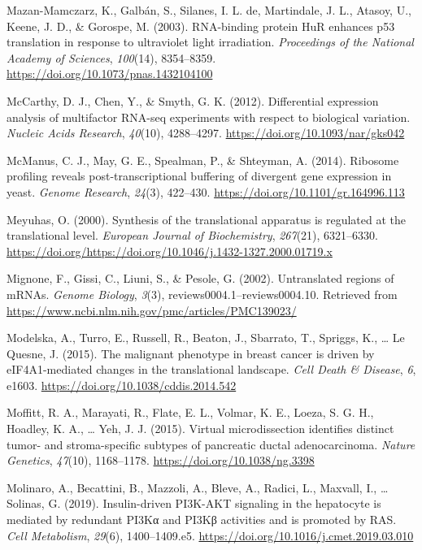 \documentclass[12pt,openany]{book}
\begin{document}
\hypertarget{ref-Mazan-Mamczarz2003}{}
Mazan-Mamczarz, K., Galbán, S., Silanes, I. L. de, Martindale, J. L.,
Atasoy, U., Keene, J. D., \& Gorospe, M. (2003). RNA-binding protein HuR
enhances p53 translation in response to ultraviolet light irradiation.
\emph{Proceedings of the National Academy of Sciences}, \emph{100}(14),
8354--8359. \url{https://doi.org/10.1073/pnas.1432104100}

\hypertarget{ref-McCarthy2012}{}
McCarthy, D. J., Chen, Y., \& Smyth, G. K. (2012). Differential
expression analysis of multifactor RNA-seq experiments with respect to
biological variation. \emph{Nucleic Acids Research}, \emph{40}(10),
4288--4297. \url{https://doi.org/10.1093/nar/gks042}

\hypertarget{ref-McManus2014}{}
McManus, C. J., May, G. E., Spealman, P., \& Shteyman, A. (2014).
Ribosome profiling reveals post-transcriptional buffering of divergent
gene expression in yeast. \emph{Genome Research}, \emph{24}(3),
422--430. \url{https://doi.org/10.1101/gr.164996.113}

\hypertarget{ref-Meyuhas2000}{}
Meyuhas, O. (2000). Synthesis of the translational apparatus is
regulated at the translational level. \emph{European Journal of
Biochemistry}, \emph{267}(21), 6321--6330.
\url{https://doi.org/https://doi.org/10.1046/j.1432-1327.2000.01719.x}

\hypertarget{ref-Mignone2002}{}
Mignone, F., Gissi, C., Liuni, S., \& Pesole, G. (2002). Untranslated
regions of mRNAs. \emph{Genome Biology}, \emph{3}(3),
reviews0004.1--reviews0004.10. Retrieved from
\url{https://www.ncbi.nlm.nih.gov/pmc/articles/PMC139023/}

\hypertarget{ref-Modelska2015}{}
Modelska, A., Turro, E., Russell, R., Beaton, J., Sbarrato, T., Spriggs,
K., \ldots{} Le Quesne, J. (2015). The malignant phenotype in breast
cancer is driven by eIF4A1-mediated changes in the translational
landscape. \emph{Cell Death \& Disease}, \emph{6}, e1603.
\url{https://doi.org/10.1038/cddis.2014.542}

\hypertarget{ref-Moffitt2015}{}
Moffitt, R. A., Marayati, R., Flate, E. L., Volmar, K. E., Loeza, S. G.
H., Hoadley, K. A., \ldots{} Yeh, J. J. (2015). Virtual microdissection
identifies distinct tumor- and stroma-specific subtypes of pancreatic
ductal adenocarcinoma. \emph{Nature Genetics}, \emph{47}(10),
1168--1178. \url{https://doi.org/10.1038/ng.3398}

\hypertarget{ref-Molinaro2019}{}
Molinaro, A., Becattini, B., Mazzoli, A., Bleve, A., Radici, L.,
Maxvall, I., \ldots{} Solinas, G. (2019). Insulin-driven PI3K-AKT
signaling in the hepatocyte is mediated by redundant PI3Kα and PI3Kβ
activities and is promoted by RAS. \emph{Cell Metabolism}, \emph{29}(6),
1400--1409.e5. \url{https://doi.org/10.1016/j.cmet.2019.03.010}
\end{document}
